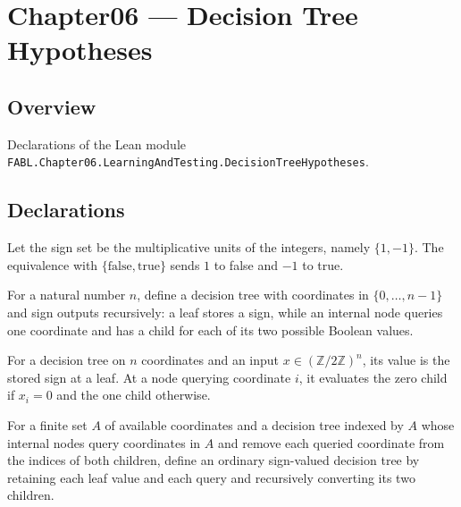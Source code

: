 \chapter{Chapter06 — Decision Tree Hypotheses}
\section{Overview}

Declarations of the Lean module \texttt{FABL.Chapter06.LearningAndTesting.DecisionTreeHypotheses}.

\section{Declarations}

\begin{definition}
\label{FABL.signBoolEquiv}
\leanok
{}
Let the sign set be the multiplicative units of the integers, namely $\{1,-1\}$. The
equivalence with $\{\mathrm{false},\mathrm{true}\}$ sends $1$ to false and $-1$ to true.
\end{definition}

\begin{definition}
\label{FABL.DecisionTreeHypothesis}
\leanok
{}
For a natural number $n$, define a decision tree with coordinates in $\{0,\ldots,n-1\}$
and sign outputs recursively: a leaf stores a sign, while an internal node queries one
coordinate and has a child for each of its two possible Boolean values.
\end{definition}

\begin{definition}
\label{FABL.DecisionTreeHypothesis.eval}
\leanok
{}
For a decision tree on $n$ coordinates and an input $x\in(\mathbb Z/2\mathbb Z)^n$, its
value is the stored sign at a leaf. At a node querying coordinate $i$, it evaluates the
zero child if $x_i=0$ and the one child otherwise.
\end{definition}

\begin{definition}
\leanok
{}
For a finite set $A$ of available coordinates and a decision tree indexed by $A$ whose
internal nodes query coordinates in $A$ and remove each queried coordinate from the
indices of both children, define an ordinary sign-valued decision tree by retaining each
leaf value and each query and recursively converting its two children.
\end{definition}

